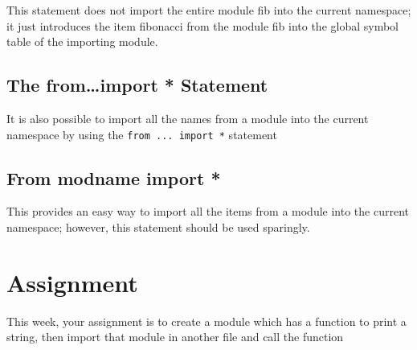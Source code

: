 \documentclass{scrartcl}
\begin{document}
This statement does not import the entire module fib into the current namespace; it just introduces the item fibonacci from the module fib into the global symbol table of the importing module.

\subsection{The from\ldots{}import * Statement}
\label{sec:org5c0a30e}
It is also possible to import all the names from a module into the current
namespace by using the \texttt{from ... import *} statement

\subsection{From modname import *}
\label{sec:orge3b63bf}
This provides an easy way to import all the items from a module into the current namespace; however, this statement should be used sparingly.

\section{Assignment}
\label{sec:orgd57ae55}
This week, your assignment is to create a module which has a function to print a
string, then import that module in another file and call the function
\end{document}
